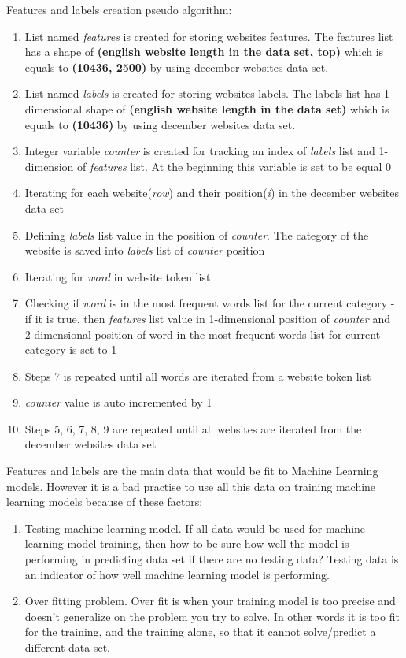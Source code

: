 Features and labels creation pseudo algorithm:
\begin{enumerate}
    \item List named \textit{features} is created for storing websites features. The features list has a shape of \textbf{(english website length in the data set, top)} which is equals to \textbf{(10436, 2500)} by using december websites data set.
    \item List named \textit{labels} is created for storing websites labels. The labels list has 1-dimensional shape of \textbf{(english website length in the data set)} which is equals to \textbf{(10436)} by using december websites data set.
    \item Integer variable \textit{counter} is created for tracking an index of \textit{labels} list and 1-dimension of \textit{features} list. At the beginning this variable is set to be equal 0
    \item Iterating for each website(\textit{row}) and their position(\textit{i}) in the december websites data set
    \item Defining \textit{labels} list value in the position of \textit{counter}. The category of the website is saved into \textit{labels} list of \textit{counter} position
    \item Iterating for \textit{word} in website token list
    \item Checking if \textit{word} is in the most frequent words list for the current category - if it is true, then \textit{features} list value in 1-dimensional position of \textit{counter} and 2-dimensional position of word in the most frequent words list for current category is set to 1
    \item Steps 7 is repeated until all words are iterated from a website token list
    \item \textit{counter} value is auto incremented by 1
    \item Steps 5, 6, 7, 8, 9 are repeated until all websites are iterated from the december websites data set 
\end{enumerate}


Features and labels are the main data that would be fit to Machine Learning models. However it is a bad practise to use all this data on training machine learning models because of these factors:
\begin{enumerate}
    \item Testing machine learning model. If all data would be used for machine learning model training, then how to be sure how well the model is performing in predicting data set if there are no testing data? Testing data is an indicator of how well machine learning model is performing.
    \item Over fitting problem. Over fit is when your training model is too precise and doesn't generalize on the problem you try to solve. In other words it is too fit for the training, and the training alone, so that it cannot solve/predict a different data set. 
\end{enumerate}

